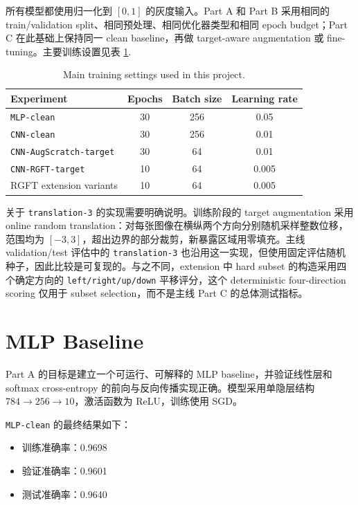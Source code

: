 \documentclass[12pt,a4paper,fontset=fandol]{ctexart}
\begin{document}
所有模型都使用归一化到 $[0,1]$ 的灰度输入。Part A 和 Part B 采用相同的 train/validation split、相同预处理、相同优化器类型和相同 epoch budget；Part C 在此基础上保持同一 clean baseline，再做 target-aware augmentation 或 fine-tuning。主要训练设置见表 \ref{tab:setup}.

\begin{table}[H]
  \centering
  \small
  \caption{Main training settings used in this project.}
  \label{tab:setup}
  \renewcommand{\arraystretch}{1.08}
  \begin{tabular}{lccc}
    \toprule
    Experiment & Epochs & Batch size & Learning rate \\
    \midrule
    \texttt{MLP-clean} & 30 & 256 & 0.05 \\
    \texttt{CNN-clean} & 30 & 256 & 0.01 \\
    \texttt{CNN-AugScratch-target} & 30 & 64 & 0.01 \\
    \texttt{CNN-RGFT-target} & 10 & 64 & 0.005 \\
    RGFT extension variants & 10 & 64 & 0.005 \\
    \bottomrule
  \end{tabular}
\end{table}

关于 \texttt{translation-3} 的实现需要明确说明。训练阶段的 target augmentation 采用 online random translation：对每张图像在横纵两个方向分别随机采样整数位移，范围均为 $[-3, 3]$，超出边界的部分裁剪，新暴露区域用零填充。主线 validation/test 评估中的 \texttt{translation-3} 也沿用这一实现，但使用固定评估随机种子，因此比较是可复现的。与之不同，extension 中 hard subset 的构造采用四个确定方向的 \texttt{left/right/up/down} 平移评分，这个 deterministic four-direction scoring 仅用于 subset selection，而不是主线 Part C 的总体测试指标。

\section{MLP Baseline}

Part A 的目标是建立一个可运行、可解释的 MLP baseline，并验证线性层和 softmax cross-entropy 的前向与反向传播实现正确。模型采用单隐层结构 $784 \rightarrow 256 \rightarrow 10$，激活函数为 ReLU，训练使用 SGD。

\texttt{MLP-clean} 的最终结果如下：
\begin{itemize}
  \item 训练准确率：0.9698
  \item 验证准确率：0.9601
  \item 测试准确率：0.9640
\end{itemize}
\end{document}
